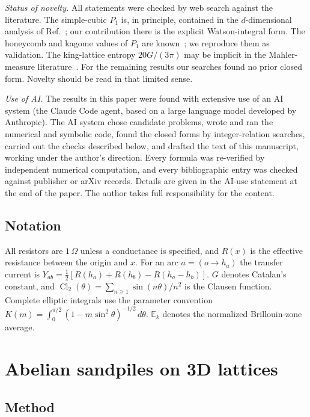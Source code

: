 \documentclass[aps,pre,10pt,twocolumn,superscriptaddress,nofootinbib]{revtex4-2}
\newcommand{\E}{\mathbb{E}}
\newcommand{\Cl}{\operatorname{Cl}_2}
\begin{document}
\emph{Status of novelty.} All statements were checked by web search against the literature. The
simple-cubic $P_1$ is, in principle, contained in the $d$-dimensional analysis of
Ref.~\cite{MajumdarDhar1991}; our contribution there is the explicit Watson-integral form. The
honeycomb and kagome values of $P_1$ are known~\cite{AzimiTafreshi2010,Liu2026}; we reproduce them
as validation. The king-lattice entropy $20G/(3\pi)$ may be implicit in the Mahler-measure
literature~\cite{GuttmannRogers2012}. For the remaining results our searches found no prior closed
form. Novelty should be read in that limited sense.

\emph{Use of AI.} The results in this paper were found with extensive use of an AI
system (the Claude Code agent, based on a large language model developed by Anthropic). The AI
system chose candidate problems, wrote and ran the numerical and symbolic code, found the
closed forms by integer-relation searches, carried out the checks described below, and drafted
the text of this manuscript, working under the author's direction. Every formula was
re-verified by independent numerical computation, and every bibliographic entry was checked
against publisher or arXiv records. Details are given in the AI-use statement at the end of
the paper. The author takes full responsibility for the content.

\subsection*{Notation}
All resistors are $1\,\Omega$ unless a conductance is specified, and $R(x)$ is the effective
resistance between the origin and $x$. For an arc $a=(o\to h_a)$ the transfer current is
$Y_{ab}=\tfrac12[R(h_a)+R(h_b)-R(h_a-h_b)]$. $G$ denotes Catalan's constant, and
$\Cl(\theta)=\sum_{n\ge1}\sin(n\theta)/n^2$ is the Clausen function. Complete elliptic integrals
use the parameter convention $K(m)=\int_0^{\pi/2}(1-m\sin^2\theta)^{-1/2}\,d\theta$.
$\E_k$ denotes the normalized Brillouin-zone average.

\section{Abelian sandpiles on 3D lattices}
\label{sec:3d}

\subsection{Method}
\end{document}
